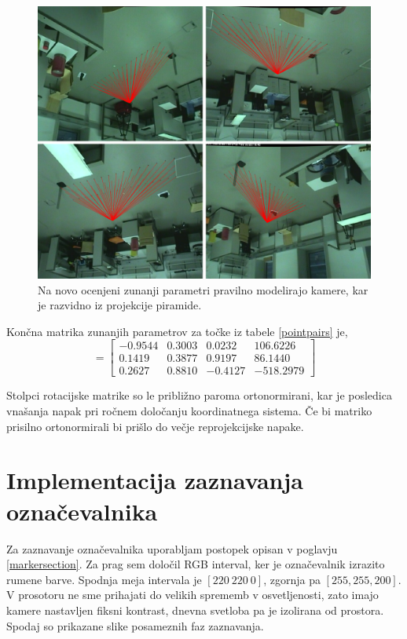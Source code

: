 \documentclass[a4paper, 12pt]{book}
\begin{document}
\begin{figure}[H]
\centering
\includegraphics[scale=0.25]{reprojection_corrected.png}
\caption{Na novo ocenjeni zunanji parametri pravilno modelirajo kamere, kar je razvidno iz projekcije piramide.}
\end{figure}

Končna matrika zunanjih parametrov za točke iz tabele \ref{pointpairs} je,
\begin{equation}
[R|\vec{T}] = 
\begin{bmatrix}
-0.9544 & 0.3003 & 0.0232 & 106.6226 \\
0.1419 & 0.3877 & 0.9197 & 86.1440 \\
0.2627 & 0.8810 & -0.4127 & -518.2979 
\end{bmatrix}
\end{equation}

Stolpci rotacijske matrike so le približno paroma ortonormirani, kar je posledica vnašanja napak pri ročnem določanju koordinatnega sistema. Če bi matriko prisilno ortonormirali bi prišlo do večje reprojekcijske napake. 

\section{Implementacija zaznavanja označevalnika}
Za zaznavanje označevalnika uporabljam postopek opisan v poglavju \ref{markersection}. Za prag sem določil RGB interval, ker je označevalnik izrazito rumene barve. Spodnja meja intervala je $[220 \ 220 \ 0]$, zgornja pa $[255, 255, 200]$. V prosotoru ne sme prihajati do velikih sprememb v osvetljenosti, zato imajo kamere nastavljen fiksni kontrast, dnevna svetloba pa je izolirana od prostora. Spodaj so prikazane slike posameznih faz zaznavanja.
\end{document}
